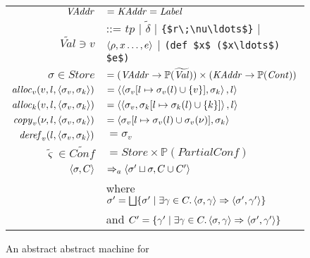 \begin{figure}
\begin{center}
\begingroup
\begin{tabular}{rl}
$\mathit{VAddr}{}$ & $=\mathit{KAddr}{}=\mathit{Label}$\\
$\widetilde{\mathit{Val}} \ni v$ 
& ::= $tp$ | $\widetilde{\delta}$
    | \lstinline!{$r\;\nu\ldots$}!
    | $\left< \rho,x\ldots,e \right>$
    | \lstinline!(def $x$ ($x\ldots$) $e$)!\\

$\sigma \in \mathit{Store} $
& $= (\mathit{VAddr}{} \rightarrow \mathbb{P}(\widetilde{\mathit{Val}}))
  \times (\mathit{KAddr}{} \rightarrow \mathbb{P}(\mathit{Cont}))$\\

$\mathit{alloc}_v(v, l, \left< \sigma_v, \sigma_k \right>)$ 
& $= \left< \left< \sigma_v[l \mapsto \sigma_v(l)\cup\{v\}], \sigma_k \right>, l \right>$\\

$\mathit{alloc}_k(v, l, \left< \sigma_v, \sigma_k \right>)$
& $= \left< \left< \sigma_v, \sigma_k[l \mapsto \sigma_k(l)\cup\{k\}] \right>, l \right>$\\

$\mathit{copy}_v(\nu, l, \left< \sigma_v, \sigma_k \right>)$
& $= \left< \sigma_v[l \mapsto \sigma_v(l)\cup\sigma_v(\nu)], \sigma_k \right>$\\

$\mathit{deref}_v(l, \left< \sigma_v, \sigma_k \right>)$ 
& $= \sigma_v$\\


$\tilde{\varsigma} \in \widetilde{\mathit{Conf}}$
& $ = Store\times\mathbb{P}(PartialConf)$\\
\hline
$\left< \sigma, C \right>$ 
& $\Rightarrow_a \left< \sigma'\sqcup\sigma, C\cup C' \right>$\\
& where $\sigma' = \bigsqcup\{\sigma' \mid \exists \gamma \in C. \left< \sigma, \gamma \right> \Rightarrow \left< \sigma', \gamma' \right> \}$\\
& and $C' = \{\gamma' \mid \exists \gamma \in C. \left< \sigma, \gamma \right> \Rightarrow \left< \sigma', \gamma' \right> \}$\\
\hline

\end{tabular}
\endgroup
\end{center}
\caption{An abstract abstract machine for \IDL{}}
\label{fig:aam}
\end{figure}

